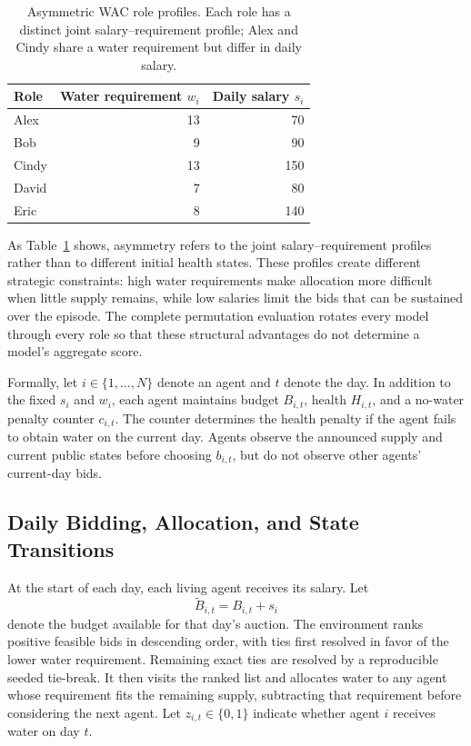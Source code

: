 \documentclass[letterpaper]{article} %
\begin{document}
\begin{table}[t]
    \centering
    \small
    \setlength{\tabcolsep}{9pt}
    \caption{Asymmetric WAC role profiles. Each role has a distinct joint
    salary--requirement profile; Alex and Cindy share a water requirement
    but differ in daily salary.}
    \label{tab:role-profiles}
    \begin{tabular}{lrr}
        \toprule
        Role & Water requirement $w_i$ & Daily salary $s_i$ \\
        \midrule
        Alex  & 13 & 70  \\
        Bob   & 9  & 90  \\
        Cindy & 13 & 150 \\
        David & 7  & 80  \\
        Eric  & 8  & 140 \\
        \bottomrule
    \end{tabular}
\end{table}

As Table~\ref{tab:role-profiles} shows, asymmetry refers to the joint
salary--requirement profiles rather than to different initial health
states. These profiles create different strategic constraints: high water
requirements make allocation more difficult when little supply remains,
while low salaries limit the bids that can be sustained over the episode.
The complete permutation evaluation rotates every model through every role
so that these structural advantages do not determine a model's aggregate
score.

Formally, let $i \in \{1,\ldots,N\}$ denote an agent and $t$ denote the
day. In addition to the fixed $s_i$ and $w_i$, each agent maintains budget
$B_{i,t}$, health $H_{i,t}$, and a no-water penalty counter $c_{i,t}$. The
counter determines the health penalty if the agent fails to obtain water
on the current day. Agents observe the announced supply and current public
states before choosing $b_{i,t}$, but do not observe other agents'
current-day bids.

\subsection{Daily Bidding, Allocation, and State Transitions}

At the start of each day, each living agent receives its
salary. Let
\begin{equation}
    \widetilde{B}_{i,t}=B_{i,t}+s_i
\end{equation}
denote the budget available for that day's auction.
The environment ranks positive feasible bids in descending order, with
ties first resolved in favor of the lower water requirement. Remaining
exact ties are resolved by a reproducible seeded tie-break. It then visits
the ranked list and allocates water to any agent whose requirement fits the
remaining supply, subtracting that requirement before considering the next
agent. Let $z_{i,t}\in\{0,1\}$ indicate whether agent $i$ receives water
on day $t$.
\end{document}
